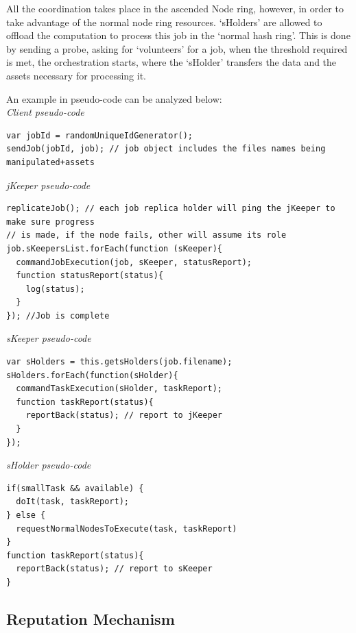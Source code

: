 All the coordination takes place in the ascended Node ring, however, in order to take advantage of the normal node ring resources. `sHolders' are allowed to offload the computation to process this job in the `normal hash ring'. This is done by sending a probe, asking for `volunteers' for a job, when the threshold required is met, the orchestration starts, where the `sHolder' transfers the data and the assets necessary for processing it.

An example in pseudo-code can be analyzed below: \\

\textit{Client pseudo-code}
\begingroup
\scriptsize
\begin{verbatim}
var jobId = randomUniqueIdGenerator();
sendJob(jobId, job); // job object includes the files names being manipulated+assets
\end{verbatim}  
\endgroup



\textit{jKeeper pseudo-code}
\begingroup
\scriptsize
\begin{verbatim}
replicateJob(); // each job replica holder will ping the jKeeper to make sure progress 
// is made, if the node fails, other will assume its role
job.sKeepersList.forEach(function (sKeeper){
  commandJobExecution(job, sKeeper, statusReport);
  function statusReport(status){
    log(status);
  }  
}); //Job is complete
\end{verbatim}
\endgroup

\textit{sKeeper pseudo-code}
\begingroup
\scriptsize
\begin{verbatim}
var sHolders = this.getsHolders(job.filename);
sHolders.forEach(function(sHolder){
  commandTaskExecution(sHolder, taskReport);
  function taskReport(status){
    reportBack(status); // report to jKeeper
  }
});
\end{verbatim}
\endgroup

\textit{sHolder pseudo-code}
\begingroup
\scriptsize
\begin{verbatim}
if(smallTask && available) {
  doIt(task, taskReport);
} else {
  requestNormalNodesToExecute(task, taskReport)
}
function taskReport(status){
  reportBack(status); // report to sKeeper
}
\end{verbatim}
\endgroup



\subsection{Reputation Mechanism}

